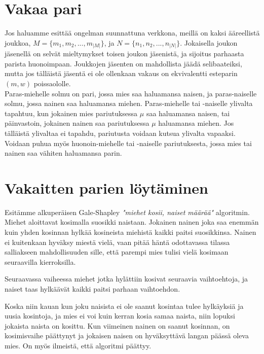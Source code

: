 \documentclass[finnish]{tktltiki2}
\theoremstyle{definition}
\theoremstyle{remark}
\begin{document}
\section{Vakaa pari}
Jos haluamme esittää ongelman suunnattuna verkkona, meillä on kaksi ääreellistä joukkoa, 
$M = \{m_{1}, m_{2},..., m_{|M|}\}$, ja $N = \{n_{1}, n_{2},...,n_{|N|}\}$. Jokaisella joukon jäsenellä on selvät mieltymykset toisen joukon jäsenistä, ja sijoitus parhaasta parista huonoimpaan. Joukkojen jäsenten on mahdollista jäädä selibaateiksi, mutta jos tälläistä jäsentä ei ole ollenkaan vakaus on ekvivalentti esteparin $(m, w)$ poissaololle.\\
Paras-miehelle solmu on pari, jossa mies saa haluamansa naisen, ja paras-naiselle solmu, jossa nainen saa haluamansa miehen. Paras-miehelle tai -naiselle ylivalta tapahtuu, kun jokainen mies pariutuksessa $\mu$ saa haluamansa naisen, tai päinvastoin, jokainen nainen saa pariutuksessa $\mu$ haluamansa miehen. Jos tälläistä ylivaltaa ei tapahdu, pariutusta voidaan kutsua ylivalta vapaaksi.\\
Voidaan puhua myös huonoin-miehelle tai -naiselle pariutuksesta, jossa mies tai nainen saa vähiten haluamansa parin.


\section{Vakaitten parien löytäminen}
Esitämme alkuperäisen Gale-Shapley \emph{"miehet kosii, naiset määrää"} algoritmin.
Miehet aloittavat kosimalla suosikki naistaan. Jokainen nainen joka saa enemmän kuin yhden kosinnan hylkää kosineista miehistä kaikki paitsi suosikkinsa. Nainen ei kuitenkaan hyväksy miestä vielä, vaan pitää häntä odottavassa tilassa salliakseen mahdollisuuden sille, että parempi mies tulisi vielä kosimaan seuraavilla kierroksilla.

Seuraavassa vaiheessa miehet jotka hylättiin kosivat seuraavia vaihtoehtoja, ja naiset taas hylkäävät kaikki paitsi parhaan vaihtoehdon.

Koska niin kauan kun joku naisista ei ole saanut kosintaa tulee hylkäyksiä ja uusia kosintoja, ja mies ei voi kuin kerran kosia samaa naista, niin lopuksi jokaista naista on kosittu. Kun viimeinen nainen on saanut kosinnan, on kosimisvaihe päättynyt ja jokaisen naisen on hyväksyttävä langan päässä oleva mies. \cite[p. 12-13]{gale62a} On myös ilmeistä, että algoritmi päättyy.
\end{document}
